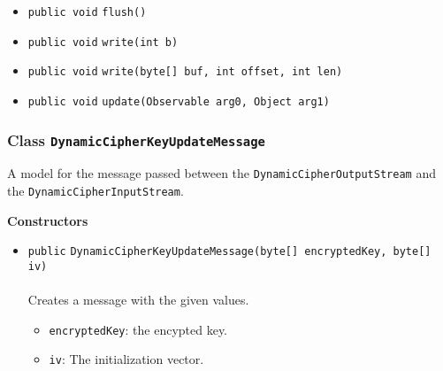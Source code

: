 \begin{itemize}
\item \lstinline|public void| \lstinline|flush|\lstinline|()| \\[-0.6em]




\item \lstinline|public void| \lstinline|write|\lstinline|(int b)| \\[-0.6em]




\item \lstinline|public void| \lstinline|write|\lstinline|(byte[] buf, int offset, int len)| \\[-0.6em]




\item \lstinline|public void| \lstinline|update|\lstinline|(Observable arg0, Object arg1)| \\[-0.6em]




\end{itemize}

\subsubsection{Class \lstinline|DynamicCipherKeyUpdateMessage|}
A model for the message passed between the \lstinline|DynamicCipherOutputStream|
 and the \lstinline|DynamicCipherInputStream|. \\
\noindent\begin{minipage}[t]{5cm}
\vspace{0.3em}
\hspace*{2em}
\vspace{0.3em}
\end{minipage}




\textbf{\sffamily Constructors}
\begin{itemize}
\item \lstinline|public| \lstinline|DynamicCipherKeyUpdateMessage|\lstinline|(byte[] encryptedKey, byte[] iv)|\\ \\[-0.6em]
Creates a message with the given values.
\begin{itemize}
\item \lstinline|encryptedKey|: the encypted key.
\item \lstinline|iv|: The initialization vector.
\end{itemize}



\end{itemize}


